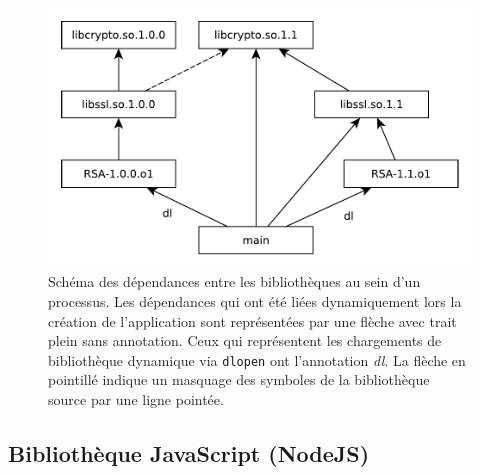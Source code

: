 \begin{center}
\begin{figure}[ht]
\includegraphics{figures/libssl_masking.pdf}

\caption{Schéma des dépendances entre les bibliothèques au sein d'un
  processus.  Les dépendances qui ont été liées dynamiquement lors la création
  de l'application sont représentées par une flèche avec trait plein sans
  annotation. Ceux qui représentent les chargements de bibliothèque dynamique via
  \texttt{dlopen} ont l'annotation \textit{dl}. La flèche en pointillé indique
  un masquage des symboles de la bibliothèque source par une ligne pointée.}

\label{fig:scm_masq_schema}
\end{figure}
\end{center}










\subsection{Bibliothèque JavaScript (NodeJS)}

